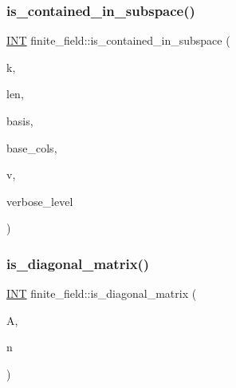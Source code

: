 \subsubsection{\texorpdfstring{is\+\_\+contained\+\_\+in\+\_\+subspace()}{is\_contained\_in\_subspace()}}
{\footnotesize\ttfamily \mbox{\hyperlink{galois_8h_a09fddde158a3a20bd2dcadb609de11dc}{I\+NT}} finite\+\_\+field\+::is\+\_\+contained\+\_\+in\+\_\+subspace (\begin{DoxyParamCaption}\item[{\mbox{\hyperlink{galois_8h_a09fddde158a3a20bd2dcadb609de11dc}{I\+NT}}}]{k,  }\item[{\mbox{\hyperlink{galois_8h_a09fddde158a3a20bd2dcadb609de11dc}{I\+NT}}}]{len,  }\item[{\mbox{\hyperlink{galois_8h_a09fddde158a3a20bd2dcadb609de11dc}{I\+NT}} $\ast$}]{basis,  }\item[{\mbox{\hyperlink{galois_8h_a09fddde158a3a20bd2dcadb609de11dc}{I\+NT}} $\ast$}]{base\+\_\+cols,  }\item[{\mbox{\hyperlink{galois_8h_a09fddde158a3a20bd2dcadb609de11dc}{I\+NT}} $\ast$}]{v,  }\item[{\mbox{\hyperlink{galois_8h_a09fddde158a3a20bd2dcadb609de11dc}{I\+NT}}}]{verbose\+\_\+level }\end{DoxyParamCaption})}

\mbox{\label{classfinite__field_a8d51d751717cb9bc67209349fb44d1ec}} 
\subsubsection{\texorpdfstring{is\+\_\+diagonal\+\_\+matrix()}{is\_diagonal\_matrix()}}
{\footnotesize\ttfamily \mbox{\hyperlink{galois_8h_a09fddde158a3a20bd2dcadb609de11dc}{I\+NT}} finite\+\_\+field\+::is\+\_\+diagonal\+\_\+matrix (\begin{DoxyParamCaption}\item[{\mbox{\hyperlink{galois_8h_a09fddde158a3a20bd2dcadb609de11dc}{I\+NT}} $\ast$}]{A,  }\item[{\mbox{\hyperlink{galois_8h_a09fddde158a3a20bd2dcadb609de11dc}{I\+NT}}}]{n }\end{DoxyParamCaption})}

\mbox{\label{classfinite__field_abf9e4cb7b3f7fef89fa676a5feb84ecd}} 
